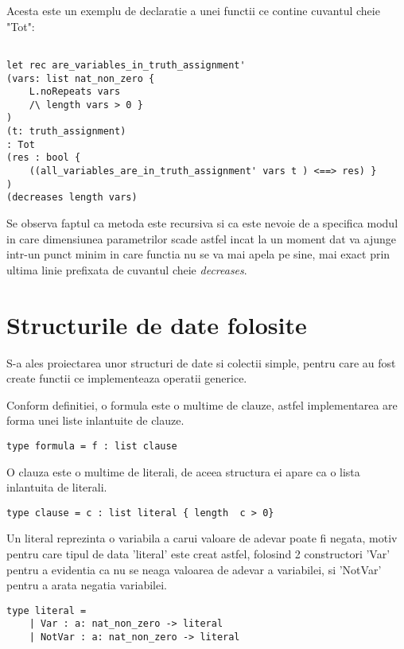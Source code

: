 Acesta este un exemplu de declaratie a unei functii ce contine cuvantul cheie "Tot":

\begin{lstlisting}[]

let rec are_variables_in_truth_assignment' 
(vars: list nat_non_zero { 
	L.noRepeats vars 
	/\ length vars > 0 }
) 
(t: truth_assignment) 
: Tot 
(res : bool { 
	((all_variables_are_in_truth_assignment' vars t ) <==> res) }
) 
(decreases length vars)

\end{lstlisting}

Se observa faptul ca metoda este recursiva si ca este nevoie de a specifica modul in care dimensiunea parametrilor scade astfel incat la un moment dat va ajunge intr-un punct minim in care functia nu se va mai apela pe sine, mai exact prin ultima linie prefixata de cuvantul cheie \textit{decreases}.

\section{Structurile de date folosite}

S-a ales proiectarea unor structuri de date si colectii simple, pentru care au fost create functii ce implementeaza operatii generice.

Conform definitiei, o formula este o multime de clauze, astfel implementarea are forma unei liste inlantuite de clauze.

\begin{lstlisting}[]
	type formula = f : list clause 
	\end{lstlisting}

O clauza este o multime de literali, de aceea structura ei apare ca o lista inlantuita de literali.

\begin{lstlisting}[]
	type clause = c : list literal { length  c > 0} 
\end{lstlisting}

Un literal reprezinta o variabila a carui valoare de adevar poate fi negata, motiv pentru care tipul de data 'literal' este creat astfel, folosind 2 constructori 'Var' pentru a evidentia ca nu se neaga valoarea de adevar a variabilei, si 'NotVar' pentru a arata negatia variabilei.

\begin{lstlisting}[]
type literal = 
	| Var : a: nat_non_zero -> literal
	| NotVar : a: nat_non_zero -> literal
\end{lstlisting}

